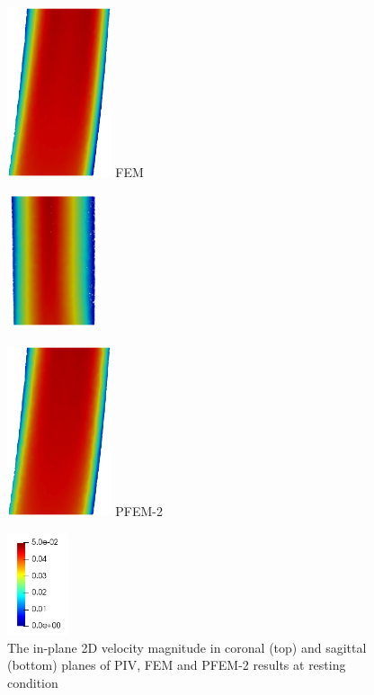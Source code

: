 \begin{figure}
\begin{minipage}[c][9.5cm][c]{0.28\textwidth}
\includegraphics[height=5cm]{imgs/vena_cava/FEM_sagittal_rest.png}
FEM
\end{minipage}
\begin{minipage}[c][9.5cm][c]{0.28\textwidth}
\centering
\vspace*{\fill}
\includegraphics[height=4cm]{imgs/vena_cava/PFEM_coronal_rest.png}

\includegraphics[height=5cm]{imgs/vena_cava/PFEM_sagittal_rest.png}
PFEM-2
\end{minipage}
\begin{minipage}[c][9.5cm][t]{0.1\textwidth}
\vspace*{\fill}
\centering
\includegraphics[height=3cm]{imgs/vena_cava/colormap_rest.png}

\end{minipage}
\caption{The in-plane 2D velocity magnitude in coronal (top) and sagittal (bottom) planes of PIV, FEM and PFEM-2 results at resting condition}
\label{fig:process1}
\end{figure}

